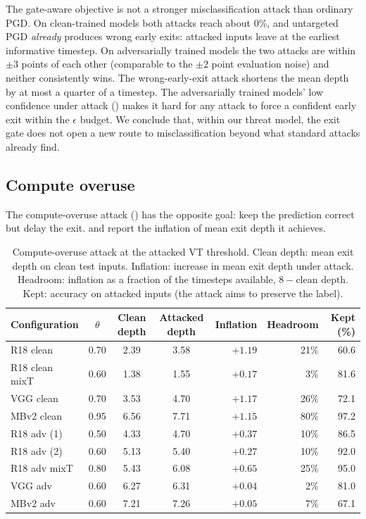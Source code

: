 The gate-aware objective is not a stronger misclassification attack than ordinary PGD. On clean-trained models both attacks reach about 0\%, and untargeted PGD \emph{already} produces wrong early exits: attacked inputs leave at the earliest informative timestep. On adversarially trained models the two attacks are within $\pm 3$ points of each other (comparable to the $\pm 2$ point evaluation noise) and neither consistently wins. The wrong-early-exit attack shortens the mean depth by at most a quarter of a timestep. The adversarially trained models' low confidence under attack () makes it hard for any attack to force a confident early exit within the $\epsilon$ budget. We conclude that, within our threat model, the exit gate does not open a new route to misclassification beyond what standard attacks already find.

\subsection{Compute overuse}

The compute-overuse attack () has the opposite goal: keep the prediction correct but delay the exit.  and  report the inflation of mean exit depth it achieves.

\begin{table}[htbp]
    \centering
    \caption[Compute-overuse attack]{Compute-overuse attack at the attacked VT threshold. Clean depth: mean exit depth on clean test inputs. Inflation: increase in mean exit depth under attack. Headroom: inflation as a fraction of the timesteps available, $8 - \text{clean depth}$. Kept: accuracy on attacked inputs (the attack aims to preserve the label).}
    \label{tab:res-overuse}
    \small
    \begin{tabular}{@{}l c c c r r r@{}}
        \toprule
        Configuration & $\theta$ & Clean depth & Attacked depth & Inflation & Headroom & Kept (\%) \\
        \midrule
        R18 clean       & 0.70 & 2.39 & 3.58 & $+1.19$ & 21\% & 60.6 \\
        R18 clean mixT  & 0.60 & 1.38 & 1.55 & $+0.17$ & 3\%  & 81.6 \\
        VGG clean       & 0.70 & 3.53 & 4.70 & $+1.17$ & 26\% & 72.1 \\
        MBv2 clean      & 0.95 & 6.56 & 7.71 & $+1.15$ & 80\% & 97.2 \\
        \midrule
        R18 adv (1)     & 0.50 & 4.33 & 4.70 & $+0.37$ & 10\% & 86.5 \\
        R18 adv (2)     & 0.60 & 5.13 & 5.40 & $+0.27$ & 10\% & 92.0 \\
        R18 adv mixT    & 0.80 & 5.43 & 6.08 & $+0.65$ & 25\% & 95.0 \\
        VGG adv         & 0.60 & 6.27 & 6.31 & $+0.04$ & 2\%  & 81.0 \\
        MBv2 adv        & 0.60 & 7.21 & 7.26 & $+0.05$ & 7\%  & 67.1 \\
        \bottomrule
    \end{tabular}
\end{table}

